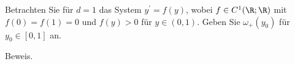 \begin{exercise}
Betrachten Sie für $d = 1$ das System $y^{\prime} = f(y)$, wobei $f \in C^1(\R;\R)$
mit $f(0) = f(1) = 0$ und $f(y) > 0$ für $y \in (0,1)$. Geben Sie $\omega_+(y_0)$
für $y_0 \in [0,1]$ an.
\end{exercise}
\begin{solution}
Beweis.
\end{solution}
